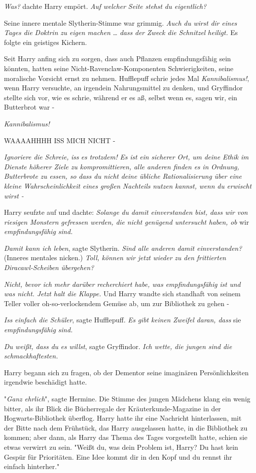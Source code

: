 {\emph{Was?} dachte Harry empört. \emph{Auf welcher Seite stehst du eigentlich?}

Seine innere mentale Slytherin-Stimme war grimmig. \emph{Auch du wirst dir eines Tages die Doktrin zu eigen machen} \emph{…} \emph{dass der Zweck die Schnitzel} \emph{heiligt.} Es folgte ein geistiges Kichern.

Seit Harry anfing sich zu sorgen, dass auch Pflanzen empfindungsfähig sein könnten, hatten seine Nicht-Ravenclaw-Komponenten Schwierigkeiten, seine moralische Vorsicht ernst zu nehmen. Hufflepuff schrie jedes Mal \emph{Kannibalismus!}, wenn Harry versuchte, an irgendein Nahrungsmittel zu denken, und Gryffindor stellte sich vor, wie es schrie, während er es aß, selbst wenn es, sagen wir, ein Butterbrot war -

\emph{Kannibalismus!}

WAAAAHHHH ISS MICH NICHT -

\emph{Ignoriere die Schreie,} \emph{iss} \emph{es trotzdem! Es ist ein sicherer Ort, um deine Ethik im Dienste höherer Ziele zu kompromittieren, alle anderen finden es in Ordnung, Butterbrote zu essen, so dass du nicht deine übliche Rationalisierung über eine kleine Wahrscheinlichkeit eines großen Nachteils nutzen kannst, wenn du erwischt wirst -}

Harry seufzte auf und dachte: \emph{Solange du damit einverstanden bist, dass wir von riesigen Monstern gefressen werden, die nicht genügend untersucht haben, ob} wir \emph{empfindungsfähig sind.}

\emph{Damit kann ich leben}, sagte Slytherin. \emph{Sind alle anderen damit einverstanden?} (Inneres mentales nicken.) \emph{Toll, können wir jetzt wieder zu den frittierten} \emph{Diracawl-Scheiben übergehen?}

\emph{Nicht, bevor ich mehr darüber recherchiert habe, was empfindungsfähig ist und was nicht. Jetzt halt die Klappe.} Und Harry wandte sich standhaft von seinem Teller voller oh-so-verlockendem Gemüse ab, um zur Bibliothek zu gehen -

\emph{Iss einfach die Schüler}, sagte Hufflepuff. \emph{Es gibt keinen Zweifel daran, dass} sie \emph{empfindungsfähig sind.}

\emph{Du weißt, dass du es willst}, sagte Gryffindor. \emph{Ich wette, die jungen sind die schmackhaftesten.}

Harry begann sich zu fragen, ob der Dementor seine imaginären Persönlichkeiten irgendwie beschädigt hatte.

"\emph{Ganz ehrlich}", sagte Hermine. Die Stimme des jungen Mädchens klang ein wenig bitter, als ihr Blick die Bücherregale der Kräuterkunde-Magazine in der Hogwarts-Bibliothek überflog. Harry hatte ihr eine Nachricht hinterlassen, mit der Bitte nach dem Frühstück, das Harry ausgelassen hatte, in die Bibliothek zu kommen; aber dann, als Harry das Thema des Tages vorgestellt hatte, schien sie etwas verwirrt zu sein. "Weißt du, was dein Problem ist, Harry? Du hast kein Gespür für Prioritäten. Eine Idee kommt dir in den Kopf und du rennst ihr einfach hinterher."

}
